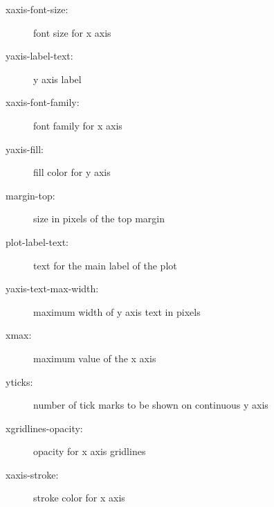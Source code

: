 \begin{description}
\item[xaxis-font-size:]{font size for x axis}
\item[yaxis-label-text:]{y axis label}
\item[xaxis-font-family:]{font family for x axis}
\item[yaxis-fill:]{fill color for y axis}
\item[margin-top:]{size in pixels of the top margin}
\item[plot-label-text:]{text for the main label of the plot}
\item[yaxis-text-max-width:]{maximum width of y axis text in pixels}
\item[xmax:]{maximum value of the x axis}
\item[yticks:]{number of tick marks to be shown on continuous y axis}
\item[xgridlines-opacity:]{opacity for x axis gridlines}
\item[xaxis-stroke:]{stroke color for x axis}
\end{description}
